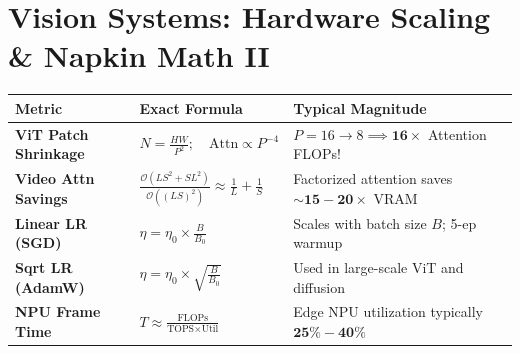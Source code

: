 \section{Vision Systems: Hardware Scaling \& Napkin Math II}\label{sec:napkin2}

\begin{mem}
\begin{tabularx}{\columnwidth}{@{}p{18mm} p{36mm} X@{}}
\toprule
\textbf{Metric} & \textbf{Exact Formula} & \textbf{Typical Magnitude} \\
\midrule
\textbf{ViT Patch Shrinkage} & $N = \frac{HW}{P^2}; \quad \text{Attn} \propto P^{-4}$ & $P=16 \to 8 \implies \mathbf{16\times}$ Attention FLOPs! \\
\textbf{Video Attn Savings} & $\frac{\mathcal{O}(LS^2 + SL^2)}{\mathcal{O}((LS)^2)} \approx \frac{1}{L} + \frac{1}{S}$ & Factorized attention saves $\mathbf{\sim 15-20\times}$ VRAM \\
\textbf{Linear LR (SGD)} & $\eta = \eta_0 \times \frac{B}{B_0}$ & Scales with batch size $B$; 5-ep warmup \\
\textbf{Sqrt LR (AdamW)} & $\eta = \eta_0 \times \sqrt{\frac{B}{B_0}}$ & Used in large-scale ViT and diffusion \\
\textbf{NPU Frame Time} & $T \approx \frac{\text{FLOPs}}{\text{TOPS} \times \text{Util}}$ & Edge NPU utilization typically $\mathbf{25\%-40\%}$ \\
\bottomrule
\end{tabularx}
\end{mem}

